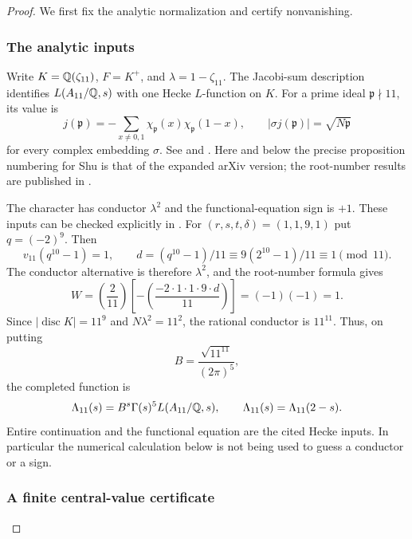\begin{proof}
We first fix the analytic normalization and certify nonvanishing.
\subsubsection{The analytic inputs}

Write $K=\mathbb Q(\zeta_{11})$, $F=K^+$, and
$\lambda=1-\zeta_{11}$. The Jacobi-sum description identifies
$L(A_{11}/\mathbb Q,s)$ with one Hecke $L$-function on $K$.
For a prime ideal $\mathfrak p\nmid11$, its value is
\[
j(\mathfrak p)=-\sum_{x\ne0,1}\chi_{\mathfrak p}(x)
                                      \chi_{\mathfrak p}(1-x),
\qquad |\sigma j(\mathfrak p)|=\sqrt{N\mathfrak p}
\]
for every complex embedding $\sigma$.
See \citet[\S1 and \S3]{GrossRohrlich1978} and
\citet[\S2.1--2.2, pp.~5--6]{ShuExpanded2021}.
Here and below the precise proposition numbering for Shu is that of
the expanded arXiv version; the root-number results are published in
\citet{Shu2021}.

The character has conductor $\lambda^2$ and the functional-equation
sign is $+1$. These inputs can be checked explicitly in
\citet[Proposition 3.12(2), p.~16; Theorem 3.13, pp.~17--18]{ShuExpanded2021}.
For $(r,s,t,\delta)=(1,1,9,1)$ put $q=(-2)^9$. Then
\[
v_{11}(q^{10}-1)=1,\qquad
 d=(q^{10}-1)/11\equiv
 9(2^{10}-1)/11\equiv1\pmod{11}.
\]
The conductor alternative is therefore $\lambda^2$, and the root-number
formula gives
\[
W=\left(\frac2{11}\right)
  \left[-\left(\frac{-2\cdot1\cdot1\cdot9\cdot d}{11}\right)\right]
  =(-1)(-1)=1.
\]
Since $|\operatorname{disc}K|=11^9$ and $N\lambda^2=11^2$, the rational
conductor is $11^{11}$. Thus, on putting
\[
B=\frac{\sqrt{11^{11}}}{(2\pi)^5},
\]
the completed function is
\begin{equation}
\Lambda_{11}(s)=B^s\Gamma(s)^5L(A_{11}/\mathbb Q,s),\qquad
\Lambda_{11}(s)=\Lambda_{11}(2-s).
\label{eq:elevenfe}
\end{equation}
Entire continuation and the functional equation are the cited Hecke
inputs. In particular the numerical calculation below is not being
used to guess a conductor or a sign.

\subsubsection{A finite central-value certificate}


\end{proof}
